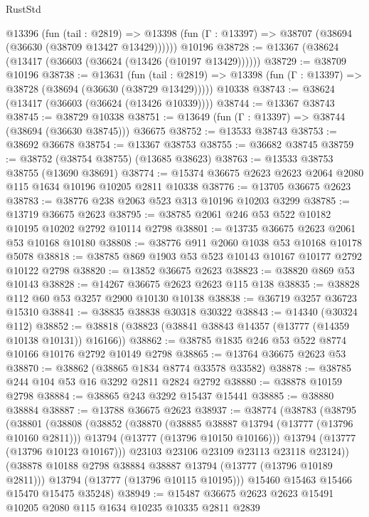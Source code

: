 \begin{lexlean}{RustStd}
\begin{coremodule}
    @13396
      (fun (tail : @2819) =>
      @13398 (fun (Γ : @13397) => @38707 (@38694 (@36630 (@38709 @13427 @13429))))))
    @10196
@38728 := @13367 (@38624 (@13417 (@36603 (@36624 (@13426 (@10197 @13429))))))
@38729 := @38709 @10196
@38738 := @13631
    (fun (tail : @2819) => @13398 (fun (Γ : @13397) => @38728 (@38694 (@36630 (@38729 @13429)))))
    @10338
@38743 := @38624 (@13417 (@36603 (@36624 (@13426 @10339))))
@38744 := @13367 @38743
@38745 := @38729 @10338
@38751 := @13649 (fun (Γ : @13397) => @38744 (@38694 (@36630 @38745))) @36675
@38752 := @13533 @38743
@38753 := @38692 @36678
@38754 := @13367 @38753
@38755 := @36682 @38745
@38759 := @38752 (@38754 @38755) (@13685 @38623)
@38763 := @13533 @38753 @38755 (@13690 @38691)
@38774 := @15374 @36675 @2623 @2623 @2064 @2080 @115 @1634 @10196 @10205 @2811 @10338
@38776 := @13705 @36675 @2623
@38783 := @38776 @238 @2063 @523 @313 @10196 @10203 @3299
@38785 := @13719 @36675 @2623
@38795 := @38785 @2061 @246 @53 @522 @10182 @10195 @10202 @2792 @10114 @2798
@38801 := @13735 @36675 @2623 @2061 @53 @10168 @10180
@38808 := @38776 @911 @2060 @1038 @53 @10168 @10178 @5078
@38818 := @38785 @869 @1903 @53 @523 @10143 @10167 @10177 @2792 @10122 @2798
@38820 := @13852 @36675 @2623
@38823 := @38820 @869 @53 @10143
@38828 := @14267 @36675 @2623 @2623 @115 @138
@38835 := @38828 @112 @60 @53 @3257 @2900 @10130 @10138
@38838 := @36719 @3257 @36723 @15310
@38841 := @38835 @38838 @30318 @30322
@38843 := @14340 (@30324 @112)
@38852 := @38818 (@38823 (@38841 @38843 @14357 (@13777 (@14359 @10138 @10131)) @16166))
@38862 := @38785 @1835 @246 @53 @522 @8774 @10166 @10176 @2792 @10149 @2798
@38865 := @13764 @36675 @2623 @53
@38870 := @38862 (@38865 @1834 @8774 @33578 @33582)
@38878 := @38785 @244 @104 @53 @16 @3292 @2811 @2824 @2792
@38880 := @38878 @10159 @2798
@38884 := @38865 @243 @3292 @15437 @15441
@38885 := @38880 @38884
@38887 := @13788 @36675 @2623
@38937 := @38774
    (@38783
      (@38795
        (@38801
          (@38808
            (@38852
              (@38870
                (@38885 @38887 @13794 (@13777 (@13796 @10160 @2811)))
                @13794
                (@13777 (@13796 @10150 @10166)))
              @13794
              (@13777 (@13796 @10123 @10167)))
            @23103
            @23106
            @23109
            @23113
            @23118
            @23124))
        (@38878 @10188 @2798 @38884 @38887 @13794 (@13777 (@13796 @10189 @2811)))
        @13794
        (@13777 (@13796 @10115 @10195)))
      @15460
      @15463
      @15466
      @15470
      @15475
      @35248)
@38949 := @15487 @36675 @2623 @2623 @15491 @10205 @2080 @115 @1634 @10235 @10335 @2811 @2839

\end{coremodule}
\end{lexlean}
